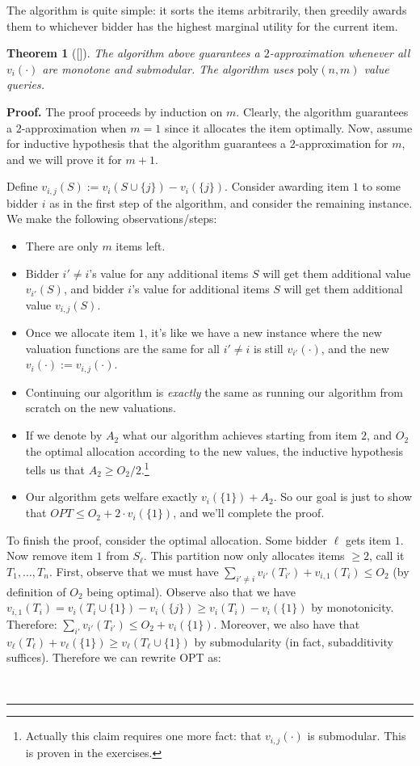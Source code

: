 \documentclass[12pt]{article}%
\newtheorem{theorem}{Theorem}
\newenvironment{proof}[1][Proof]{\textbf{#1.} }{\ \rule{0.5em}{0.5em}}
\newcommand{\poly}{\text{poly}}
\begin{document}
The algorithm is quite simple: it sorts the items arbitrarily, then greedily awards them to whichever bidder has the highest marginal utility for the current item. 

\begin{theorem}[\textrm{[\cite{LehmannLN01}]}]
The algorithm above guarantees a $2$-approximation whenever all $v_i(\cdot)$ are monotone and submodular. The algorithm uses $\poly(n,m)$ value queries.
\end{theorem}
\begin{proof}
The proof proceeds by induction on $m$. Clearly, the algorithm guarantees a $2$-approximation when $m =1$ since it allocates the item optimally. Now, assume for inductive hypothesis that the algorithm guarantees a $2$-approximation for $m$, and we will prove it for $m+1$.

Define $v_{i,j}(S) := v_i(S \cup \{j\}) - v_i(\{j\})$. Consider awarding item $1$ to some bidder $i$ as in the first step of the algorithm, and consider the remaining instance. We make the following observations/steps:
\begin{itemize}
    \item There are only $m$ items left. 
    \item Bidder $i' \neq i$'s value for any additional items $S$ will get them additional value $v_{i'}(S)$, and bidder $i$'s value for additional items $S$ will get them additional value $v_{i,j}(S)$. 
    \item Once we allocate item $1$, it's like we have a new instance where the new valuation functions are the same for all $i' \neq i$ is still $v_{i'}(\cdot)$, and the new $v_i(\cdot) := v_{i,j}(\cdot).$
    \item Continuing our algorithm is \emph{exactly} the same as running our algorithm from scratch on the new valuations.
    \item If we denote by $A_2$ what our algorithm achieves starting from item $2$, and $O_2$ the optimal allocation according to the new values, the inductive hypothesis tells us that $A_2 \geq O_2/2$.\footnote{Actually this claim requires one more fact: that $v_{i,j}(\cdot)$ is submodular. This is proven in the exercises.}
    \item Our algorithm gets welfare exactly $v_i(\{1\}) + A_2$. So our goal is just to show that $OPT \leq O_2 + 2\cdot v_i(\{1\})$, and we'll complete the proof. 
\end{itemize}
To finish the proof, consider the optimal allocation. Some bidder $\ell$ gets item $1$. Now remove item $1$ from $S_\ell$. This partition now only allocates items $\geq 2$, call it $T_1,\ldots, T_n$. First, observe that we must have $\sum_{i' \neq i} v_{i'}(T_{i'}) + v_{i,1}(T_i) \leq O_2$ (by definition of $O_2$ being optimal). Observe also that we have $v_{i,1}(T_i) = v_i(T_i \cup \{1\}) - v_i(\{j\}) \geq v_i(T_i) - v_i(\{1\})$ by monotonicity. Therefore: $\sum_{i'} v_{i'}(T_{i'}) \leq O_2 + v_i(\{1\})$. Moreover, we also have that $v_\ell(T_\ell) + v_\ell(\{1\}) \geq v_\ell(T_\ell \cup \{1\})$ by submodularity (in fact, subadditivity suffices). Therefore we can rewrite OPT as:


\end{proof}
\end{document}
